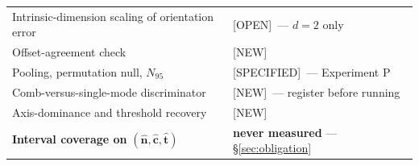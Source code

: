 \documentclass[11pt]{article}
\newcommand{\nhat}{\hat{n}}
\newcommand{\chat}{\hat{c}}
\newcommand{\that}{\hat{t}}
\newcommand{\provtag}[2]{{\footnotesize\sffamily\textcolor{#1}{[#2]}}}
\newcommand{\SPEC}{\provtag{specblue}{SPECIFIED}}
\newcommand{\NEWT}{\provtag{newmag}{NEW}}
\newcommand{\OPENT}{\provtag{openamber}{OPEN}}
\begin{document}
\begin{table}[h]
\begin{tabular}{@{}p{}p{}@{}}
Intrinsic-dimension scaling of orientation error & \OPENT\ --- $d = 2$ only\\
Offset-agreement check & \NEWT\\
Pooling, permutation null, $N_{95}$ & \SPEC\ --- Experiment P\\
Comb-versus-single-mode discriminator & \NEWT\ --- register before running\\
Axis-dominance and threshold recovery & \NEWT\\
\textbf{Interval coverage on} $\bm{(\nhat,\chat,\that)}$
  & \textbf{never measured} --- \S\ref{sec:obligation}\\
\bottomrule
\end{tabular}
\end{table}
\end{document}
